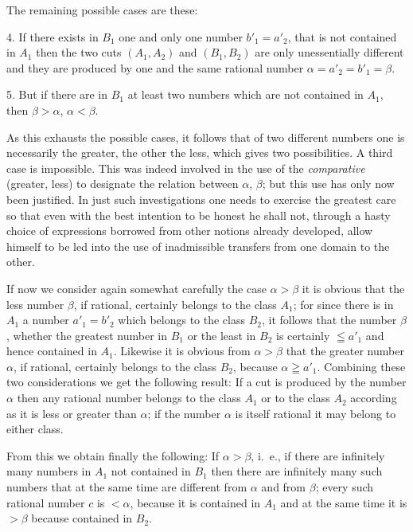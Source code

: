 \documentclass[oneside]{book}
\begin{document}
The remaining possible cases are these:

4. If there exists in $B_1$ one and only one number
$b'_1 = a'_2$, that is not contained in $A_1$ then the two cuts
$(A_1, A_2)$ and $(B_1, B_2)$ are only unessentially different
and they are produced by one and the same rational
number $\alpha = a'_2 = b'_1 = \beta$.

5. But if there are in $B_1$ at least two numbers
which are not contained in $A_1$, then $\beta > \alpha$, $\alpha < \beta$.

As this exhausts the possible cases, it follows that
of two different numbers one is necessarily the greater,
the other the less, which gives two possibilities. A
third case is impossible. This was indeed involved
in the use of the \textit{comparative} (greater, less) to designate
the relation between $\alpha$, $\beta$; but this use has only
now been justified. In just such investigations one
needs to exercise the greatest care so that even with
the best intention to be honest he shall not, through
a hasty choice of expressions borrowed from other notions
already developed, allow himself to be led into
the use of inadmissible transfers from one domain to
the other.

If now we consider again somewhat carefully the
case $\alpha>\beta$ it is obvious that the less number $\beta$, if
rational, certainly belongs to the class $A_1$; for since
there is in $A_1$ a number $a'_1=b'_2$ which belongs to the
class $B_2$, it follows that the number $\beta$, whether the
greatest number in $B_1$ or the least in $B_2$ is certainly
$\leqq a'_1$ and hence contained in $A_1$. Likewise it is obvious
from $\alpha>\beta$ that the greater number $\alpha$, if rational,
certainly belongs to the class $B_2$, because $\alpha \geqq a'_1$. Combining
these two considerations we get the following
result: If a cut is produced by the number $\alpha$ then any
rational number belongs to the class $A_1$ or to the class
$A_2$ according as it is less or greater than $\alpha$; if the
number $\alpha$ is itself rational it may belong to either
class.

From this we obtain finally the following: If $\alpha>\beta$,
i.~e., if there are infinitely many numbers in $A_1$ not
contained in $B_1$ then there are infinitely many such
numbers that at the same time are different from $\alpha$ and
from $\beta$; every such rational number $c$ is $<\alpha$, because
it is contained in $A_1$ and at the same time it is $>\beta$
because contained in $B_2$.
\end{document}
